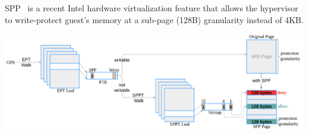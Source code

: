 \documentclass[landscape,a0paper,fontscale=0.3]{baposter} %
\begin{document}
\begin{poster}
{ %
    SPP~\cite{spp} is a recent Intel hardware virtualization feature that allows the hypervisor to write-protect guest’s memory at a sub-page (128B) granularity instead of 4KB.
    \begin{center}
        \includegraphics[width=.95\columnwidth]{figures/spp_walk}
    \end{center}    
}


\end{poster}
\end{document}
